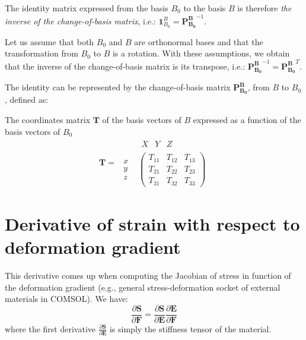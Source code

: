 \documentclass[letterpaper,12pt,oneside]{report}
\begin{document}
The identity matrix expressed from the basis $B_0$ to the basis $B$ is therefore \emph{the inverse of the change-of-basis matrix}, i.e.: $\mathbf{1}_{B_0}^B = \mathbf{P_{B_0}^B}^{-1}$.

Let us assume that both $B_0$ and $B$ are orthonormal bases and that the transformation from $B_0$ to $B$ is a rotation. With these assumptions, we obtain that the inverse of the change-of-basis matrix is its transpose, i.e.: $\mathbf{P_{B_0}^B}^{-1} = \mathbf{P_{B_0}^B}^{T}$.



The identity can be represented by the change-of-basis matrix $\mathbf{P_{B_0}^B}$, from $B$ to $B_0$, defined as:

The coordinates matrix $\mathbf{T}$ of the basis vectors of $B$ expressed as a function of the basis vectors of $B_0$
\begin{equation}
\mathbf{T} =
\begin{array}{cc}
& \begin{array}{ccc} X & Y & Z \end{array} \\
\begin{array}{c} x \\ y \\ z \end{array} &
\left(\begin{array}{ccc}
T_{11} & T_{12} & T_{13} \\
T_{21} & T_{22} & T_{23} \\
T_{31} & T_{32} & T_{33}
\end{array}\right)
\end{array}
\end{equation}



\section{Derivative of strain with respect to deformation gradient}

This derivative comes up when computing the Jacobian of stress in function of the deformation gradient (e.g., general stress-deformation socket of external materials in COMSOL). We have:
\begin{equation}
\frac{\partial \mathbf{S}}{\partial \mathbf{F}} = \frac{\partial \mathbf{S}}{\partial \mathbf{E}} \frac{\partial \mathbf{E}}{\partial \mathbf{F}}
\end{equation}
where the first derivative $\frac{\partial \mathbf{S}}{\partial \mathbf{E}}$ is simply the stiffness tensor of the material.
\end{document}
